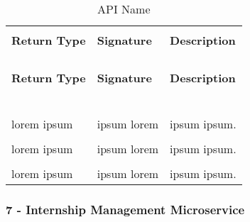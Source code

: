 \begin{longtable}{p{}p{}p{}}
    \caption{API Name}
    \vspace{0.5em}\\
    \hline
    \vspace{0.5em}\\
    \textbf{Return Type} & \textbf{Signature} & \textbf{Description} \\
    \vspace{0.5em}\\
    \hline
    \vspace{0.5em}\\
    \endfirsthead
    \vspace{0.5em}\\
    \hline
    \vspace{0.5em}\\
    \textbf{Return Type} & \textbf{Signature} & \textbf{Description} \\
    \vspace{0.5em}\\
    \hline
    \vspace{0.5em}\\
    \endhead
    
    \vspace{0.5em}\\
    \hline
    \vspace{0.5em}\\
    \endfoot
    
    \vspace{0.5em}\\
    \hline
    \vspace{0.5em}\\
    \endlastfoot
    
    lorem ipsum &
    ipsum lorem &
    ipsum ipsum. \\
    \vspace{0.5em}\\
    lorem ipsum &
    ipsum lorem &
    ipsum ipsum. \\
    \vspace{0.5em}\\
    lorem ipsum &
    ipsum lorem &
    ipsum ipsum. \\

\end{longtable}

\subsubsection{7 - Internship Management Microservice}

